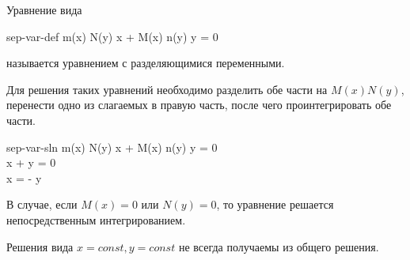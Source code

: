 
\begin{definition}
  Уравнение вида
  \begin{lequation}{sep-var-def}
    m(x) N(y) \dd x + M(x) n(y) \dd y = 0
  \end{lequation}
  называется уравнением с разделяющимися переменными.
\end{definition}

Для решения таких уравнений необходимо разделить обе части на \(M(x) N(y)\),
перенести одно из слагаемых в правую часть, после чего проинтегрировать обе
части.

\begin{lequation}{sep-var-sln}
  m(x) N(y) \dd x + M(x) n(y) \dd y = 0 \\
   \dd x +  \dd y = 0 \\
  \int {} \dd x = - \int {} \dd y 
\end{lequation}

\begin{remark}
  В случае, если \(M(x) = 0\) или \(N(y) = 0\), то уравнение решается
  непосредственным интегрированием.
\end{remark}

\begin{remark}
  Решения вида \(x = const, y = const\) не всегда получаемы из общего решения.
\end{remark}

